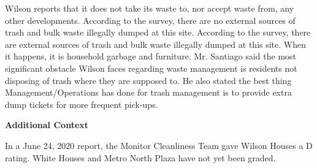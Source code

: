 Wilson reports that it does not take its waste to, nor accept waste from, any other developments. According to the survey, there are no external sources of trash and bulk waste illegally dumped at this site. According to the survey, there are external sources of trash and bulk waste illegally dumped at this site. When it happens, it is household garbage and furniture. Mr.  Santiago said the most significant obstacle Wilson faces regarding waste management is residents not disposing of trash where they are supposed to. He also stated the best thing Management/Operations has done for trash management is to provide extra dump tickets for more frequent pick-ups. 

\textbf{Additional Context}  

In a June 24, 2020 report, the Monitor Cleanliness Team gave Wilson Houses a D rating. White Houses and Metro North Plaza have not yet been graded. 

 